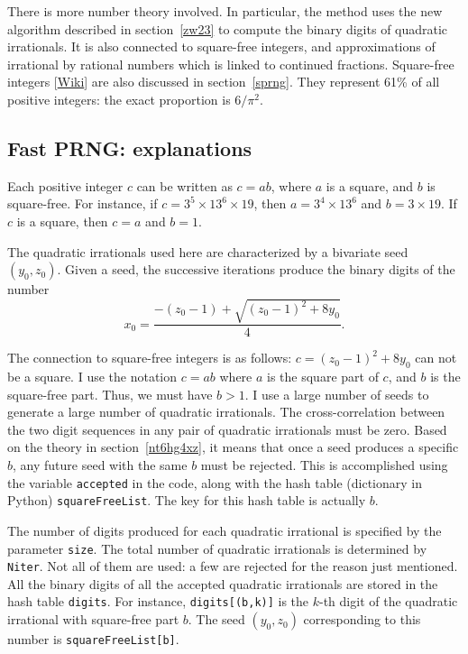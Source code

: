 \documentclass[oneside,10pt]{book}
\begin{document}
There is more number theory involved. In particular, the method uses the new algorithm
 described in section~\ref{zw23} to compute the binary digits of quadratic irrationals. It is also connected
 to \textcolor{index}{square-free integers}, and approximations of irrational by rational numbers which is linked to continued fractions.
 Square-free integers [\href{https://en.wikipedia.org/wiki/Square-free_integer}{Wiki}] are also discussed in section~\ref{sprng}. They represent
61\% of all positive integers: the exact proportion is $6/\pi^2$.

\subsection{Fast PRNG: explanations}\label{5fdi75fg}

Each positive integer  $c$ can be written as $c=ab$, where $a$ is a square, and $b$ is square-free. For instance, if $c=3^5 \times 13^6 \times 19$, then $a=3^4\times 13^6$ and $b=3\times 19$. If $c$ is a square, then $c=a$ and $b=1$.

The quadratic irrationals used here are characterized by a bivariate \textcolor{index}{seed} $(y_0, z_0)$. Given a seed, the successive iterations produce the binary digits of the number
 \begin{equation}
x_0 = \frac{-(z_0-1) + \sqrt{(z_0-1)^2+8y_0}}{4}.\label{butaneneon}
\end{equation}

The connection to square-free integers is as follows: $c=(z_0-1)^2 +8y_0$ can not be a square. I use the notation
 $c=ab$ where $a$ is the square part of $c$, and $b$ is the square-free part. Thus, we must have $b>1$. I use a large number of seeds to generate a large number of quadratic irrationals. The cross-correlation between the two digit sequences in any pair of quadratic irrationals must be zero. Based on the theory in section~\ref{nt6hg4xz}, it means that once a seed produces a specific $b$, any future seed with the same $b$ must be rejected. This is accomplished using the variable \texttt{accepted} in the code, along with
 the \textcolor{index}{hash table} (dictionary in Python) \texttt{squareFreeList}. The key for this hash table is actually $b$.

The number of digits produced for each quadratic irrational is specified by the parameter \texttt{size}. The total number of quadratic irrationals is determined by \texttt{Niter}. Not all of them are used: a few are rejected for the reason just mentioned. All the binary digits of all the accepted quadratic irrationals are stored in the hash table \texttt{digits}. For instance,
 \texttt{digits[(b,k)]} is the $k$-th digit of the quadratic irrational with square-free part $b$. The
 seed $(y_0,z_0)$ corresponding to this number is \texttt{squareFreeList[b]}.
\end{document}
